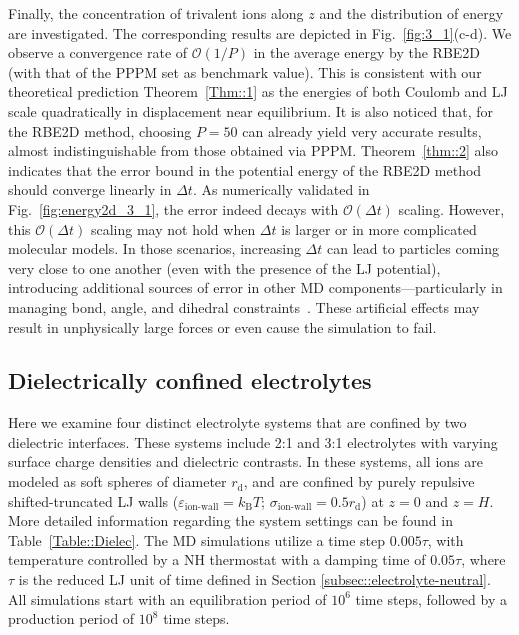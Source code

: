 Finally, the concentration of trivalent ions along $z$ and the distribution of energy are investigated.
The corresponding results are depicted in Fig.~\ref{fig:3_1}(c-d). 
We observe a convergence rate of $\mathcal{O}(1/P)$ in the average energy by the RBE2D (with that of the PPPM set as benchmark value). 
This is consistent with our theoretical prediction Theorem~\ref{Thm::1} as the energies of both Coulomb and LJ scale quadratically in displacement near equilibrium.
It is also noticed that, for the RBE2D method, choosing $P=50$ can already yield very accurate results, almost indistinguishable from those obtained via PPPM. 
 {Theorem~\ref{thm::2} also indicates that the error bound in the potential energy of the RBE2D method should converge linearly in $\Delta t$. 
 As numerically validated in Fig.~\ref{fig:energy2d_3_1}, the error indeed decays with $\mathcal{O}(\Delta t)$ scaling. However, this $\mathcal{O}(\Delta t)$ scaling may not hold when $\Delta t$ is larger or in more complicated molecular models. 
 In those scenarios, increasing \(\Delta t\) can lead to particles coming very close to one another (even with the presence of the LJ potential), introducing additional sources of error in other MD components—particularly in managing bond, angle, and dihedral constraints~\cite{frenkel2023understanding}. These artificial effects may result in unphysically large forces or even cause the simulation to fail.}

\subsection{Dielectrically confined electrolytes}

Here we examine four distinct electrolyte systems that are confined by two dielectric interfaces.
These systems include 2:1 and 3:1 electrolytes with varying surface charge densities and dielectric contrasts.
In these systems, all ions are modeled as soft spheres of diameter $r_{\text{d}}$, and are confined by purely repulsive shifted-truncated LJ walls ($\varepsilon_{\text{ion-wall}}=k_{\text{B}}T$; $\sigma_{\text{ion-wall}}=0.5r_{\text{d}}$) at $z=0$ and $z=H$. More detailed information regarding the system settings can be found in Table~\ref{Table::Dielec}.
The MD simulations utilize a time step $0.005\tau$, with temperature controlled by a NH thermostat %
with a damping time of $0.05\tau$,  {where $\tau$ is the reduced LJ unit of time defined in Section \ref{subsec::electrolyte-neutral}}.
All simulations start with an equilibration period of $10^6$ time steps, followed by a production period of $10^8$ time steps.

